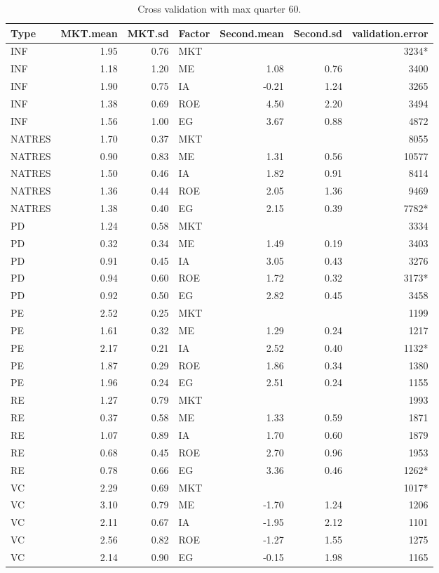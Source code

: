 \documentclass[12pt]{article}
\begin{document}
\begin{table}[ht]
	\centering
	\begin{tabular}{lrrlrrr}
		Type & MKT.mean & MKT.sd & Factor & Second.mean & Second.sd & validation.error \\ 
		\hline
		\hline
		INF & 1.95 & 0.76 & MKT &  &  & 3234* \\ 
		INF & 1.18 & 1.20 & ME & 1.08 & 0.76 & 3400 \\ 
		INF & 1.90 & 0.75 & IA & -0.21 & 1.24 & 3265 \\ 
		INF & 1.38 & 0.69 & ROE & 4.50 & 2.20 & 3494 \\ 
		INF & 1.56 & 1.00 & EG & 3.67 & 0.88 & 4872 \\ 
		\hline
		NATRES & 1.70 & 0.37 & MKT &  &  & 8055 \\ 
		NATRES & 0.90 & 0.83 & ME & 1.31 & 0.56 & 10577 \\ 
		NATRES & 1.50 & 0.46 & IA & 1.82 & 0.91 & 8414 \\ 
		NATRES & 1.36 & 0.44 & ROE & 2.05 & 1.36 & 9469 \\ 
		NATRES & 1.38 & 0.40 & EG & 2.15 & 0.39 & 7782* \\ 
		\hline
		PD & 1.24 & 0.58 & MKT &  &  & 3334 \\ 
		PD & 0.32 & 0.34 & ME & 1.49 & 0.19 & 3403 \\ 
		PD & 0.91 & 0.45 & IA & 3.05 & 0.43 & 3276 \\ 
		PD & 0.94 & 0.60 & ROE & 1.72 & 0.32 & 3173* \\ 
		PD & 0.92 & 0.50 & EG & 2.82 & 0.45 & 3458 \\ 
		\hline
		PE & 2.52 & 0.25 & MKT &  &  & 1199 \\ 
		PE & 1.61 & 0.32 & ME & 1.29 & 0.24 & 1217 \\ 
		PE & 2.17 & 0.21 & IA & 2.52 & 0.40 & 1132* \\ 
		PE & 1.87 & 0.29 & ROE & 1.86 & 0.34 & 1380 \\ 
		PE & 1.96 & 0.24 & EG & 2.51 & 0.24 & 1155 \\ 
		\hline
		RE & 1.27 & 0.79 & MKT &  &  & 1993 \\ 
		RE & 0.37 & 0.58 & ME & 1.33 & 0.59 & 1871 \\ 
		RE & 1.07 & 0.89 & IA & 1.70 & 0.60 & 1879 \\ 
		RE & 0.68 & 0.45 & ROE & 2.70 & 0.96 & 1953 \\ 
		RE & 0.78 & 0.66 & EG & 3.36 & 0.46 & 1262* \\
		\hline
		VC & 2.29 & 0.69 & MKT &  &  & 1017* \\ 
		VC & 3.10 & 0.79 & ME & -1.70 & 1.24 & 1206 \\ 
		VC & 2.11 & 0.67 & IA & -1.95 & 2.12 & 1101 \\ 
		VC & 2.56 & 0.82 & ROE & -1.27 & 1.55 & 1275 \\ 
		VC & 2.14 & 0.90 & EG & -0.15 & 1.98 & 1165 \\ 
		\hline
		\hline
	\end{tabular}
	\caption{Cross validation with max quarter 60.} 
\end{table}
\end{document}
